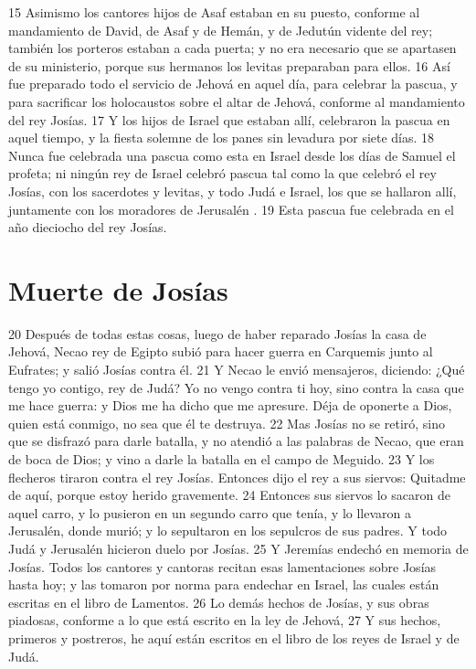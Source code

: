 15 Asimismo los cantores hijos de Asaf estaban en su puesto, conforme al mandamiento de David, de Asaf y de Hemán, y de Jedutún vidente del rey; también los porteros estaban a cada puerta; y no era necesario que se apartasen de su ministerio, porque sus hermanos los levitas preparaban para ellos.
16 Así fue preparado todo el servicio de Jehová en aquel día, para celebrar la pascua, y para sacrificar los holocaustos sobre el altar de Jehová, conforme al mandamiento del rey Josías.
17 Y los hijos de Israel que estaban allí, celebraron la pascua en aquel tiempo, y la fiesta solemne de los panes sin levadura por siete días. 
18 Nunca fue celebrada una pascua como esta en Israel desde los días de Samuel el profeta; ni ningún rey de Israel celebró pascua tal como la que celebró el rey Josías, con los sacerdotes y levitas, y todo Judá e Israel, los que se hallaron allí, juntamente con los moradores de Jerusalén .
19 Esta pascua fue celebrada en el año dieciocho del rey Josías.
\section*{Muerte de Josías}

 
20 Después de todas estas cosas, luego de haber reparado Josías la casa de Jehová, Necao rey de Egipto subió para hacer guerra en Carquemis junto al Eufrates; y salió Josías contra él.
21 Y Necao le envió mensajeros, diciendo: ¿Qué tengo yo contigo, rey de Judá? Yo no vengo contra ti hoy, sino contra la casa que me hace guerra: y Dios me ha dicho que me apresure. Déja de oponerte a Dios, quien está conmigo, no sea que él te destruya.
22 Mas Josías no se retiró, sino que se disfrazó para darle batalla, y no atendió a las palabras de Necao, que eran de boca de Dios; y vino a darle la batalla en el campo de Meguido.
23 Y los flecheros tiraron contra el rey Josías. Entonces dijo el rey a sus siervos: Quitadme de aquí, porque estoy herido gravemente.
24 Entonces sus siervos lo sacaron de aquel carro, y lo pusieron  en un segundo carro que tenía, y lo llevaron a Jerusalén, donde murió; y lo sepultaron en los sepulcros de sus padres. Y todo Judá y Jerusalén  hicieron duelo por Josías.
25 Y Jeremías endechó en memoria de Josías. Todos los cantores y cantoras recitan esas lamentaciones sobre Josías hasta hoy; y las tomaron por norma para endechar en Israel, las cuales están escritas en el libro de Lamentos.
26 Lo demás hechos de Josías, y sus obras piadosas, conforme a lo que está escrito en la ley de Jehová,
27 Y sus hechos, primeros y postreros, he aquí están escritos en el libro de los reyes de Israel y de Judá.

